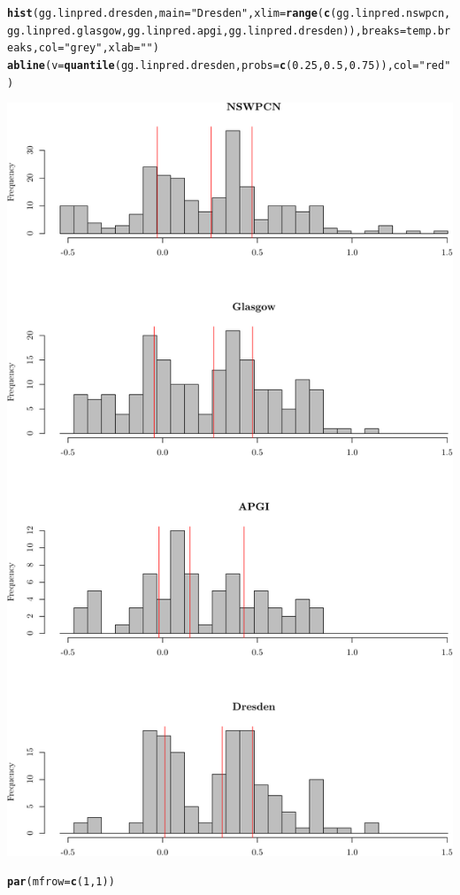 \documentclass{article}\usepackage[]{graphicx}\usepackage[]{color}
\makeatletter
\def\maxwidth{ %
  \ifdim\Gin@nat@width>\linewidth
    \linewidth
  \else
    \Gin@nat@width
  \fi
}
\newcommand{\hlnum}[1]{\textcolor[rgb]{0.686,0.059,0.569}{#1}}%
\newcommand{\hlstr}[1]{\textcolor[rgb]{0.192,0.494,0.8}{#1}}%
\newcommand{\hlstd}[1]{\textcolor[rgb]{0.345,0.345,0.345}{#1}}%
\newcommand{\hlkwc}[1]{\textcolor[rgb]{0.333,0.667,0.333}{#1}}%
\newcommand{\hlkwd}[1]{\textcolor[rgb]{0.737,0.353,0.396}{\textbf{#1}}}%
\newenvironment{kframe}{%
 \def\at@end@of@kframe{}%
 \ifinner\ifhmode%
  \def\at@end@of@kframe{\end{minipage}}%
  \begin{minipage}{\columnwidth}%
 \fi\fi%
 \def\FrameCommand##1{\hskip\@totalleftmargin \hskip-\fboxsep
 \colorbox{shadecolor}{##1}\hskip-\fboxsep
     \hskip-\linewidth \hskip-\@totalleftmargin \hskip\columnwidth}%
 \MakeFramed {\advance\hsize-\width
   \@totalleftmargin\z@ \linewidth\hsize
   \@setminipage}}%
 {\par\unskip\endMakeFramed%
 \at@end@of@kframe}
\newenvironment{knitrout}{}{} %
\makeatother
\begin{document}
\begin{knitrout}
\begin{kframe}
\begin{alltt}
\hlkwd{hist}\hlstd{(gg.linpred.dresden,} \hlkwc{main} \hlstd{=} \hlstr{"Dresden"}\hlstd{,} \hlkwc{xlim} \hlstd{=} \hlkwd{range}\hlstd{(}\hlkwd{c}\hlstd{(gg.linpred.nswpcn, gg.linpred.glasgow, gg.linpred.apgi, gg.linpred.dresden)),} \hlkwc{breaks} \hlstd{= temp.breaks,} \hlkwc{col} \hlstd{=} \hlstr{"grey"}\hlstd{,} \hlkwc{xlab} \hlstd{=} \hlstr{""}\hlstd{)}
\hlkwd{abline}\hlstd{(}\hlkwc{v} \hlstd{=} \hlkwd{quantile}\hlstd{(gg.linpred.dresden,} \hlkwc{probs} \hlstd{=} \hlkwd{c}\hlstd{(}\hlnum{0.25}\hlstd{,} \hlnum{0.5}\hlstd{,} \hlnum{0.75}\hlstd{)),} \hlkwc{col} \hlstd{=} \hlstr{"red"}\hlstd{)}
\end{alltt}
\end{kframe}

{\centering \includegraphics[width=\maxwidth]{figure/07-score-hists-1} 

}


\begin{kframe}\begin{alltt}
\hlkwd{par}\hlstd{(}\hlkwc{mfrow} \hlstd{=} \hlkwd{c}\hlstd{(}\hlnum{1}\hlstd{,} \hlnum{1}\hlstd{))}
\end{alltt}
\end{kframe}
\end{knitrout}
\end{document}
